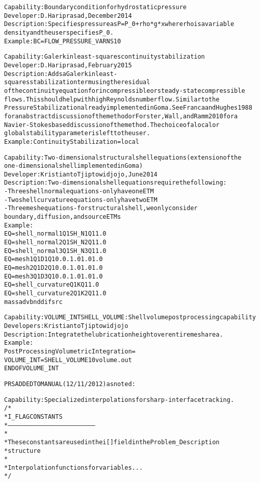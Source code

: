 \documentclass{article}
\begin{document}
\begin{alltt}
Capability: Boundary condition for hydrostatic pressure
Developer: D. Hariprasad, December 2014
Description: Specifies pressure as P = P_0 + rho*g*x where rho is a variable
density and the user specifies P_0.
Example:  BC = FLOW_PRESSURE_VAR NS 1 0

Capability: Galerkin least-squares continuity stabilization 
Developer: D. Hariprasad, February 2015
Description: Adds a Galerkin least-squares stabilization term using the residual
of the continuity equation for incompressible or steady-state compressible
flows.  This should help with high Reynolds number flow.  Similar to the
Pressure Stabilization already implemented in Goma.  See Franca and Hughes 1988
for an abstract discussion of the method or Forster, Wall, and Ramm 2010 for a
Navier-Stokes based discussion of the method.  The choice of a local or
global stability parameter is left to the user.
Example: Continuity Stabilization = local


Capability:  Two-dimensional structural shell equations (extension of the
one-dimensional shell implemented in Goma)
Developer: Kristianto Tjiptowidjojo, June 2014
Description:  Two-dimensional shell equations require the following: 
             - Three shell normal equations - only have one ETM
             - Two shell curvature equations - only have two ETM
             - Three mesh equations - for structural shell, we only consider
             boundary, diffusion, and source ETMs 
Example: 
EQ = shell_normal1    Q1  SH_N1 Q1                1.0
EQ = shell_normal2    Q1  SH_N2 Q1                1.0
EQ = shell_normal3    Q1  SH_N3 Q1                1.0
EQ = mesh1            Q1  D1    Q1  0.   0.  1.0  1.0  1.0
EQ = mesh2            Q1  D2    Q1  0.   0.  1.0  1.0  1.0
EQ = mesh3            Q1  D3    Q1  0.   0.  1.0  1.0  1.0
EQ = shell_curvature  Q1  K     Q1                1.0
EQ = shell_curvature2 Q1  K2    Q1                1.0
                                    mass adv bnd  dif  src

Capability: VOLUME_INT SHELL_VOLUME: Shell volume post processing capability 
Developers: Kristianto Tjiptowidjojo
Description:  Integrate the lubrication height over entire mesh area.  
Example: 
Post Processing Volumetric Integration =
VOLUME_INT = SHELL_VOLUME 1 0 volume.out
END OF VOLUME_INT


PRS ADDED TO MANUAL (12/11/2012) as noted:

Capability:  Specialized interpolations for sharp-interface tracking. 
/*
 * I_FLAG CONSTANTS
 * ------------------------------------------------------------------------
 *
 * These constants are used in the i[] field in the Problem_Description
 * structure
 *
 * Interpolation functions for variables...
 */


\end{alltt}
\end{document}
